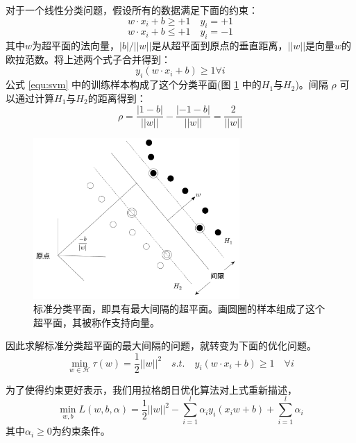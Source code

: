 对于一个线性分类问题，假设所有的数据满足下面的约束：
\begin{equation}
	w\cdot x_i +b \geq + 1 \quad y_i = +1
	\label{equ:constraint1}
\end{equation}
\begin{equation}
	w\cdot x_i +b \leq + 1 \quad y_i = -1
	\label{equ:constraint2}
\end{equation}
其中$w$为超平面的法向量，$|b|/||w||$是从超平面到原点的垂直距离，$||w||$是向量$w$的欧拉范数。将上述两个式子合并得到：
\begin{equation}
	y_i(w\cdot x_i+b)\geq 1 \forall i
	\label{equ:svm}
\end{equation}
公式 \ref{equ:svm} 中的训练样本构成了这个分类平面(图 \ref{fig:hyperplanes} 中的$H_1$与$H_2$)。间隔 $\rho$ 可以通过计算$H_1$与$H_2$的距离得到：
\begin{equation}
	\rho=\frac{|1-b|}{||w||}-\frac{|-1-b|}{||w||}=\frac{2}{||w||}
\end{equation}
\begin{figure}[H]
	\centering
	\includegraphics[width=0.7\textwidth]{figures/emitter/svm_hard}
	\caption{标准分类平面，即具有最大间隔的超平面。画圆圈的样本组成了这个超平面，其被称作支持向量。}
	\label{fig:hyperplanes}
\end{figure}
因此求解标准分类超平面的最大间隔的问题，就转变为下面的优化问题。
\begin{equation}
	\min \limits_{w\in \mathcal{H}} \tau(w)=\frac{1}{2}||w||^2\quad s.t. \quad y_i(w\cdot x_i +b) \geq 1 \quad \forall i
	\label{equ:optimization}
\end{equation}

为了使得约束更好表示，我们用拉格朗日优化算法对上式重新描述，
\begin{equation}
	\min \limits_{w,b} L(w,b,\alpha)=\frac{1}{2}||w||^2-\sum_{i=1}^l\alpha_i y_i (x_i w + b) + \sum_{i=1}^l{\alpha_i}
	\label{equ:lagrange}
\end{equation}
其中$\alpha_i \geq 0$为约束条件。

